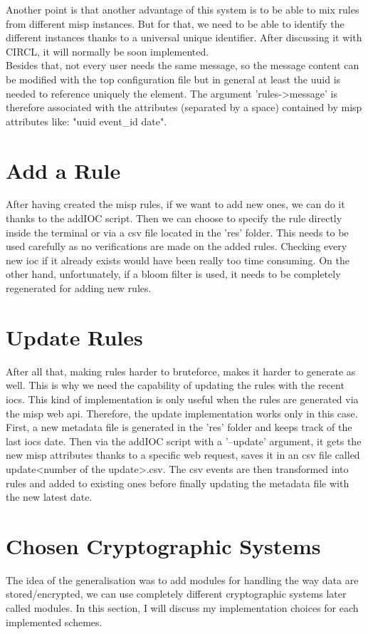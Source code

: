 \documentclass{eplmastersthesis}
\begin{document}
Another point is that another advantage of this system is to be able to mix rules from different \gls{misp} instances. But for that, we need to be able to identify the different instances thanks to a universal unique identifier. After discussing it with CIRCL, it will normally be soon implemented.\\

Besides that, not every user needs the same message, so the message content can be modified with the top configuration file but in general at least the \gls{uuid} is needed to reference uniquely the element.
The argument 'rules->message' is therefore associated with the attributes (separated by a space) contained by \gls{misp} attributes like: "uuid event\_id date".

\section{Add a Rule}
\label{sec:AddRule}
After having created the \gls{misp} rules, if we want to add new ones, we can do it thanks to the addIOC script.
Then we can choose to specify the rule directly inside the terminal or via a \gls{csv} file located in the 'res' folder.
This needs to be used carefully as no verifications are made on the added rules. Checking every new \gls{ioc} if it already exists would have been really too time consuming.
On the other hand, unfortunately, if a bloom filter is used, it needs to be completely regenerated for adding new rules.

\section{Update Rules}
After all that, making rules harder to bruteforce, makes it harder to generate as well. This is why we need the capability of updating the rules with the recent \glspl{ioc}.
This kind of implementation is only useful when the rules are generated via the \gls{misp} web \gls{api}. Therefore, the update implementation works only in this case.
First, a new metadata file is generated in the 'res' folder and keeps track of the last \glspl{ioc} date. Then via the addIOC script with a '--update' argument, it gets the new \gls{misp} attributes thanks to a specific web request, saves it in an \gls{csv} file called update<number of the update>.csv.
The \gls{csv} events are then transformed into rules and added to existing ones before finally updating the metadata file with the new latest date.

\section{Chosen Cryptographic Systems}
The idea of the generalisation was to add modules for handling the way data are stored/encrypted, we can use completely different cryptographic systems later called modules. In this section, I will discuss my implementation choices for each implemented schemes.
\end{document}

